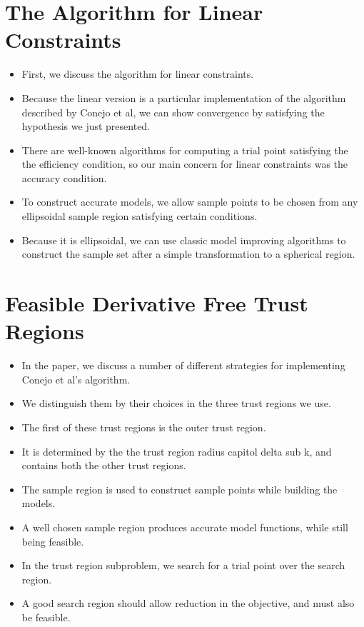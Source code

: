 \documentclass{article}
\begin{document}
	\section{The Algorithm for Linear Constraints}
\begin{itemize}
\item First, we discuss the algorithm for linear constraints.	
\item Because the linear version is a particular implementation of the algorithm described by Conejo et al, we can show convergence by satisfying the hypothesis we just presented.
\item There are well-known algorithms for computing a trial point satisfying the the efficiency condition, so our main concern for linear constraints was the accuracy condition.
\item To construct accurate models, we allow sample points to be chosen from any ellipsoidal sample region satisfying certain conditions.
\item Because it is ellipsoidal, we can use classic model improving algorithms to construct the sample set after a simple transformation to a spherical region.
\end{itemize}


	\section{Feasible Derivative Free Trust Regions}
\begin{itemize}
\item In the paper, we discuss a number of different strategies for implementing Conejo et al's algorithm.
\item We distinguish them by their choices in the three trust regions we use.
\item The first of these trust regions is the outer trust region.
\item It is determined by the the trust region radius capitol delta sub k, and contains both the other trust regions.
\item The sample region is used to construct sample points while building the models.
\item A well chosen sample region produces accurate model functions, while still being feasible.
\item In the trust region subproblem, we search for a trial point over the search region.
\item A good search region should allow reduction in the objective, and must also be feasible.
\end{itemize}
\end{document}
